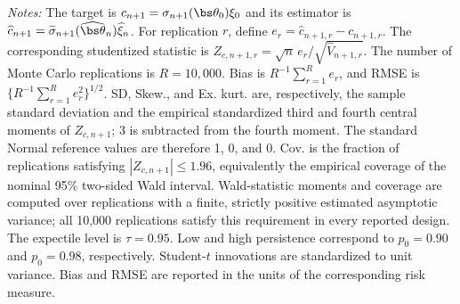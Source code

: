 \begin{table}
\begin{minipage}{0.98\textheight}
\textit{Notes:} The target is $c_{n+1}=\sigma_{n+1}(\bs\theta_0)\xi_0$ and its estimator is $\widehat c_{n+1}=\widetilde\sigma_{n+1}(\widehat{\bs\theta}_n)\widehat\xi_n$. For replication $r$, define $e_r=\widehat c_{n+1,r}-c_{n+1,r}$. The corresponding studentized statistic is $Z_{c,n+1,r}=\sqrt n\,e_r/\sqrt{\widehat V_{n+1,r}}$. The number of Monte Carlo replications is $R=10{,}000$. Bias is $R^{-1}\sum_{r=1}^{R}e_r$, and RMSE is $\{R^{-1}\sum_{r=1}^{R}e_r^2\}^{1/2}$. SD, Skew., and Ex. kurt. are, respectively, the sample standard deviation and the empirical standardized third and fourth central moments of $Z_{c,n+1}$; 3 is subtracted from the fourth moment. The standard Normal reference values are therefore 1, 0, and 0. Cov. is the fraction of replications satisfying $|Z_{c,n+1}|\leq 1.96$, equivalently the empirical coverage of the nominal 95\% two-sided Wald interval. Wald-statistic moments and coverage are computed over replications with a finite, strictly positive estimated asymptotic variance; all 10,000 replications satisfy this requirement in every reported design. The expectile level is $\tau=0.95$. Low and high persistence correspond to $p_0=0.90$ and $p_0=0.98$, respectively. Student-$t$ innovations are standardized to unit variance. Bias and RMSE are reported in the units of the corresponding risk measure.
\end{minipage}
\end{table}
